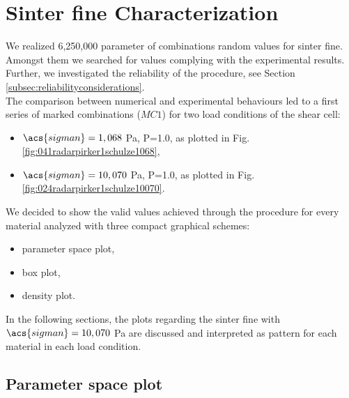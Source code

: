 \section{Sinter fine Characterization}
\label{sec:sinterfinecharacterization}

We realized 6,250,000 parameter of combinations random values for sinter fine.
Amongst them we searched for values complying with the experimental results.
Further, we investigated the reliability of the procedure, see Section
\ref{subsec:reliabilityconsiderations}.\\
The comparison between numerical and experimental behaviours led to a first
series of marked combinations ($MC1$) for two load conditions of
the shear cell:
\begin{itemize}
  \item{$\acs{sigman} = 1,068$ Pa, P=1.0, as plotted in Fig.
  \ref{fig:041radarpirker1schulze1068},}
  \item{$\acs{sigman} = 10,070$ Pa, P=1.0, as plotted in Fig.
  \ref{fig:024radarpirker1schulze10070}.}
\end{itemize}
We decided to show the valid values achieved through the procedure for every
material analyzed with three compact graphical schemes:

\begin{itemize}
  \item{parameter space plot,}
  \item{box plot,}
  \item{density plot.}
\end{itemize}

In the following sections, the plots regarding the sinter fine with
$\acs{sigman} = 10,070$ Pa are discussed and interpreted as pattern for each
material in each load condition.

\subsection{Parameter space plot}
\label{subsec:parameterspaceplot}

